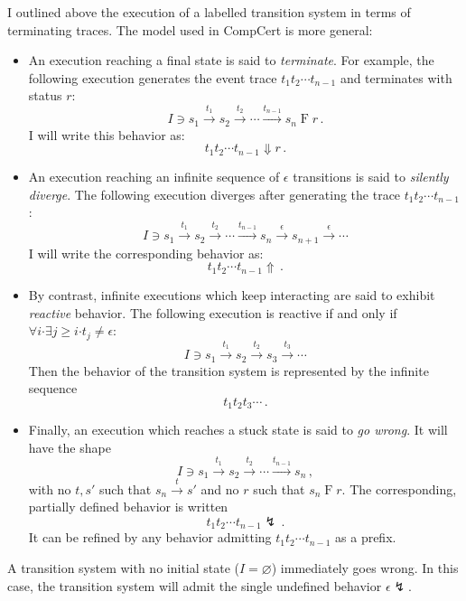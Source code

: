 \documentclass[11pt,oneside]{book}
\theoremstyle{definition}
\newcommand{\bdot}{\boldsymbol{\cdot}}
\begin{document}
I outlined above the execution of a labelled transition system
in terms of terminating traces.
The model used in CompCert is more general:
\begin{itemize}
\item An execution reaching a final state is said to
    \emph{terminate}.
    For example,
    the following execution generates
    the event trace $t_1 t_2 \cdots t_{n-1}$
    and terminates with status $r$:
    \[
        I \ni s_1 \stackrel{t_1}{\rightarrow}
          s_2 \stackrel{t_2}{\rightarrow}
          \cdots \stackrel{t_{n-1}}{\rightarrow}
          s_n \mathrel{F} r \,.
    \]
    I will write this behavior as:
    \[
      t_1 t_2 \cdots t_{n-1} \Downarrow r
      \,.
    \]
\item An execution reaching
    an infinite sequence of $\epsilon$ transitions
    is said to \emph{silently diverge}.
    The following execution diverges after
    generating the trace $t_1 t_2 \cdots t_{n-1}$:
    \[
        I \ni s_1 \stackrel{t_1}{\rightarrow}
          s_2 \stackrel{t_2}{\rightarrow}
          \cdots \stackrel{t_{n-1}}{\rightarrow}
          s_n \stackrel{\epsilon}{\rightarrow}
          s_{n+1} \stackrel{\epsilon}{\rightarrow}
          \cdots
    \]
    I will write the corresponding behavior as:
    \[
      t_1 t_2 \cdots t_{n-1} \Uparrow
      \,.
    \]
\item By contrast,
    infinite executions which keep interacting
    are said to exhibit \emph{reactive} behavior.
    The following execution
    is reactive if and only if
    $\forall i \bdot \exists j \ge i \bdot t_j \ne \epsilon$:
    \[
        I \ni s_1 \stackrel{t_1}{\rightarrow}
          s_2 \stackrel{t_2}{\rightarrow}
          s_3 \stackrel{t_3}{\rightarrow}
          \cdots
    \]
    Then the behavior of the transition system
    is represented by the infinite sequence
    \[
      t_1 t_2 t_3 \cdots
      \,.
    \]
\item Finally, an execution which reaches a stuck state
    is said to \emph{go wrong}. It will have the shape
    \[
        I \ni s_1 \stackrel{t_1}{\rightarrow}
          s_2 \stackrel{t_2}{\rightarrow}
          \cdots \stackrel{t_{n-1}}{\rightarrow}
          s_n \,,
    \]
    with no $t, s'$ such that
    $s_n \stackrel{t}{\rightarrow} s'$
    and no $r$ such that $s_n \mathrel{F} r$.
    The corresponding, partially defined behavior is written
    \[
      t_1 t_2 \cdots t_{n-1} \lightning
      \,.
    \]
    It can be refined by any behavior
    admitting $t_1 t_2 \cdots t_{n-1}$ as a prefix.
\end{itemize}
A transition system with no initial state ($I = \varnothing$)
immediately goes wrong.
In this case,
the transition system will admit the single undefined behavior
$\epsilon \lightning$.
\end{document}
